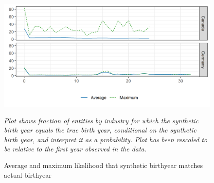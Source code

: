 \begin{figure}[ht]
\includegraphics[width=\linewidth]{r-graphs/fig_conf_both.png}
\caption{Average and maximum likelihood that synthetic birthyear matches actual birthyear\label{fig:Conf.Both}}

\begin{center}
\begin{minipage}{0.8\linewidth}
	\footnotesize \it
Plot shows fraction of entities by industry for which the synthetic birth year equals the true birth year, conditional on the synthetic birth year, and interpret it as a probability. Plot has been rescaled to be relative to the first year observed in the data.	
\end{minipage}
\end{center}
\end{figure}